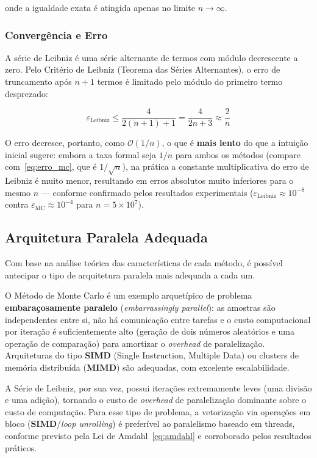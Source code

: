\documentclass[12pt, a4paper]{article}
\begin{document}
	\noindent onde a igualdade exata é atingida apenas no limite $n \to \infty$.
	
	\subsubsection{Convergência e Erro}
	
	A série de Leibniz é uma série alternante de termos com módulo decrescente a zero.
	Pelo Critério de Leibniz (Teorema das Séries Alternantes), o erro de truncamento
	após $n+1$ termos é limitado pelo módulo do primeiro termo desprezado:
	
	\begin{equation}
		\varepsilon_{\text{Leibniz}} \leq \frac{4}{2(n+1)+1} = \frac{4}{2n+3}
		\approx \frac{2}{n}
		\label{eq:erro_leibniz}
	\end{equation}
	
	\noindent O erro decresce, portanto, como $\mathcal{O}(1/n)$, o que é
	\textbf{mais lento} do que a intuição inicial sugere: embora a taxa formal seja
	$1/n$ para ambos os métodos (compare com~\eqref{eq:erro_mc}, que é $1/\sqrt{n}$),
	na prática a constante multiplicativa do erro de Leibniz é muito menor, resultando
	em erros absolutos muito inferiores para o mesmo $n$ — conforme confirmado pelos
	resultados experimentais ($\varepsilon_\text{Leibniz} \approx 10^{-8}$ contra
	$\varepsilon_\text{MC} \approx 10^{-4}$ para $n = 5 \times 10^7$).
	
	\subsection{Arquitetura Paralela Adequada}
	
	Com base na análise teórica das características de cada método, é possível
	antecipar o tipo de arquitetura paralela mais adequada a cada um.
	
	O Método de Monte Carlo é um exemplo arquetípico de problema \textbf{embaraçosamente
		paralelo} (\textit{embarrassingly parallel}): as amostras são independentes entre
	si, não há comunicação entre tarefas e o custo computacional por iteração é
	suficientemente alto (geração de dois números aleatórios e uma operação de
	comparação) para amortizar o \textit{overhead} de paralelização. Arquiteturas do
	tipo \textbf{SIMD} (Single Instruction, Multiple Data) ou clusters de memória
	distribuída (\textbf{MIMD}) são adequadas, com excelente escalabilidade.
	
	A Série de Leibniz, por sua vez, possui iterações extremamente leves (uma divisão
	e uma adição), tornando o custo de \textit{overhead} de paralelização dominante
	sobre o custo de computação. Para esse tipo de problema, a vetorização via operações
	em bloco (\textbf{SIMD}/\textit{loop unrolling}) é preferível ao paralelismo
	baseado em threads, conforme previsto pela Lei de Amdahl~\eqref{eq:amdahl} e
	corroborado pelos resultados práticos.
	
\end{document}
